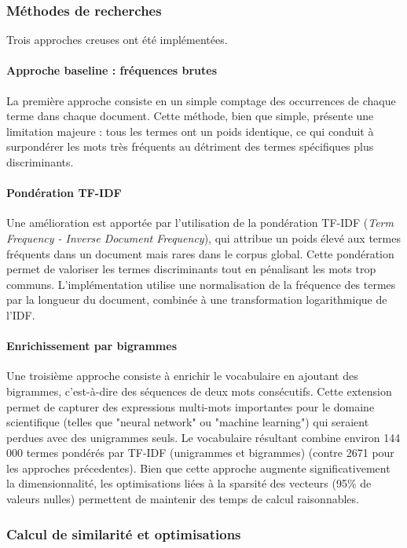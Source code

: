 \documentclass{rapportECL}
\begin{document}
\subsubsection{Méthodes de recherches}

Trois approches creuses ont été implémentées.

\paragraph{Approche baseline : fréquences brutes}
La première approche consiste en un simple comptage des occurrences de chaque terme dans chaque document. Cette méthode, bien que simple, présente une limitation majeure : tous les termes ont un poids identique, ce qui conduit à surpondérer les mots très fréquents au détriment des termes spécifiques plus discriminants.

\paragraph{Pondération TF-IDF}
Une amélioration est apportée par l'utilisation de la pondération TF-IDF (\textit{Term Frequency - Inverse Document Frequency}), qui attribue un poids élevé aux termes fréquents dans un document mais rares dans le corpus global. Cette pondération permet de valoriser les termes discriminants tout en pénalisant les mots trop communs. L'implémentation utilise une normalisation de la fréquence des termes par la longueur du document, combinée à une transformation logarithmique de l'IDF.

\paragraph{Enrichissement par bigrammes}
Une troisième approche consiste à enrichir le vocabulaire en ajoutant des bigrammes, c'est-à-dire des séquences de deux mots consécutifs. Cette extension permet de capturer des expressions multi-mots importantes pour le domaine scientifique (telles que "neural network" ou "machine learning") qui seraient perdues avec des unigrammes seuls. Le vocabulaire résultant combine environ 144\,000 termes pondérés par TF-IDF (unigrammes et bigrammes) (contre 2671 pour les approches précedentes). Bien que cette approche augmente significativement la dimensionnalité, les optimisations liées à la sparsité des vecteurs (95\% de valeurs nulles) permettent de maintenir des temps de calcul raisonnables.

\subsubsection{Calcul de similarité et optimisations}
\end{document}
